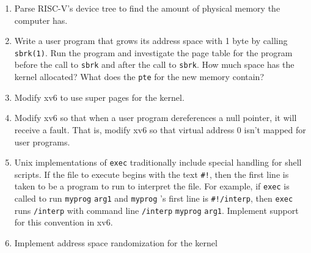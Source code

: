 \begin{enumerate}
  
\item Parse RISC-V's device tree to find the amount of physical memory
the computer has.

\item Write a user program that grows its address space with 1 byte by calling
\lstinline{sbrk(1)}.
Run the  program and investigate the page table for the program before the call
to
\lstinline{sbrk}
and after the call to
\lstinline{sbrk}.
How much space has the kernel allocated?  What does the
\lstinline{pte}
for the new memory contain?

\item Modify xv6 to use super pages for the kernel.

\item Modify xv6 so that when a user program dereferences a null pointer, it will
receive a fault.  That is, modify xv6 so that virtual address 0 isn't mapped for
user programs.

\item Unix implementations of
\lstinline{exec}
traditionally include special handling for shell scripts.
If the file to execute begins with the text
\lstinline{#!},
then the first line is taken to be a program
to run to interpret the file.
For example, if
\lstinline{exec}
is called to run
\lstinline{myprog}
\lstinline{arg1}
and
\lstinline{myprog} 's
first line is
\lstinline{#!/interp},
then
\lstinline{exec}
runs
\lstinline{/interp}
with command line
\lstinline{/interp}
\lstinline{myprog}
\lstinline{arg1}.
Implement support for this convention in xv6.

\item Implement address space randomization for the kernel

\end{enumerate}

